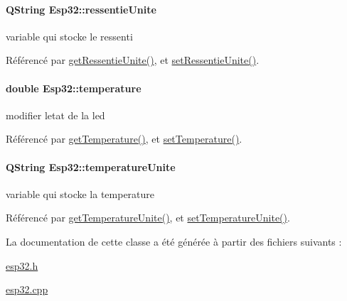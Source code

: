 \paragraph[{\texorpdfstring{ressentie\+Unite}{ressentieUnite}}]{\setlength{\rightskip}{0pt plus 5cm}Q\+String Esp32\+::ressentie\+Unite\hspace{0.3cm}{\ttfamily [private]}}\hypertarget{class_esp32_a5333681c08a07f1877c20cfe88b7024f}{}\label{class_esp32_a5333681c08a07f1877c20cfe88b7024f}
variable qui stocke le ressenti 

Référencé par \hyperlink{class_esp32_a548ed7533f742d087c65df256479ed00}{get\+Ressentie\+Unite()}, et \hyperlink{class_esp32_abf8a7f9942150b6c17cc5d1cc7b0fc8a}{set\+Ressentie\+Unite()}.

\paragraph[{\texorpdfstring{temperature}{temperature}}]{\setlength{\rightskip}{0pt plus 5cm}double Esp32\+::temperature\hspace{0.3cm}{\ttfamily [private]}}\hypertarget{class_esp32_a8274802633ca34c07fbfe7fa38a171a8}{}\label{class_esp32_a8274802633ca34c07fbfe7fa38a171a8}
modifier l\textquotesingle{}etat de la led 

Référencé par \hyperlink{class_esp32_adb339413686f3d78df1ecd41f106fd4e}{get\+Temperature()}, et \hyperlink{class_esp32_a8e7a509ed5704bee4bc527ae297f14f0}{set\+Temperature()}.

\paragraph[{\texorpdfstring{temperature\+Unite}{temperatureUnite}}]{\setlength{\rightskip}{0pt plus 5cm}Q\+String Esp32\+::temperature\+Unite\hspace{0.3cm}{\ttfamily [private]}}\hypertarget{class_esp32_a825526f0d6b74fda9ddeba7e67ec9dd5}{}\label{class_esp32_a825526f0d6b74fda9ddeba7e67ec9dd5}
variable qui stocke la temperature 

Référencé par \hyperlink{class_esp32_ae20c976b79f87de083ca8ee49b2abf25}{get\+Temperature\+Unite()}, et \hyperlink{class_esp32_a709c261e1cea7b6bbd2ea1b09b1d7ec0}{set\+Temperature\+Unite()}.



La documentation de cette classe a été générée à partir des fichiers suivants \+:\begin{DoxyCompactItemize}
\item 
\hyperlink{esp32_8h}{esp32.\+h}\item 
\hyperlink{esp32_8cpp}{esp32.\+cpp}\end{DoxyCompactItemize}
